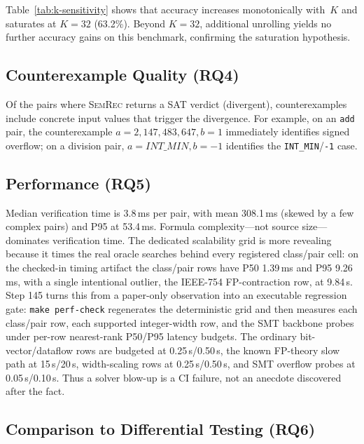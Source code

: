 \documentclass[10pt,a4paper]{article}
\begin{document}
Table~\ref{tab:k-sensitivity} shows that accuracy increases
monotonically with~$K$ and saturates at $K{=}32$ (63.2\%).
Beyond $K{=}32$, additional unrolling yields no further accuracy
gains on this benchmark, confirming the saturation hypothesis.

\subsection{Counterexample Quality (RQ4)}\label{sec:eval-cex}

Of the pairs where \textsc{SemRec} returns a SAT verdict (divergent),
counterexamples include concrete input values that trigger the
divergence.  For example, on an \texttt{add} pair, the counterexample
$a = 2{,}147{,}483{,}647, b = 1$ immediately identifies signed
overflow; on a division pair, $a = \mathit{INT\_MIN}, b = -1$
identifies the \texttt{INT\_MIN}/\texttt{-1} case.

\subsection{Performance (RQ5)}\label{sec:eval-perf}

Median verification time is 3.8\,ms per pair, with mean 308.1\,ms
(skewed by a few complex pairs) and P95 at 53.4\,ms.
Formula complexity---not
source size---dominates verification time.
The dedicated scalability grid is more revealing because it times the real
oracle searches behind every registered class/pair cell: on the checked-in
timing artifact the class/pair rows have P50 1.39\,ms and P95 9.26\,ms, with a
single intentional outlier, the IEEE-754 FP-contraction row, at 9.84\,s.  Step
145 turns this from a paper-only observation into an executable regression gate:
\texttt{make perf-check} regenerates the deterministic grid and then measures
each class/pair row, each supported integer-width row, and the SMT backbone
probes under per-row nearest-rank P50/P95 latency budgets.  The ordinary
bit-vector/dataflow rows are budgeted at 0.25\,s/0.50\,s, the known FP-theory
slow path at 15\,s/20\,s, width-scaling rows at 0.25\,s/0.50\,s, and SMT
overflow probes at 0.05\,s/0.10\,s.  Thus a solver blow-up is a CI failure, not
an anecdote discovered after the fact.

\subsection{Comparison to Differential Testing (RQ6)}\label{sec:eval-baseline}
\end{document}
